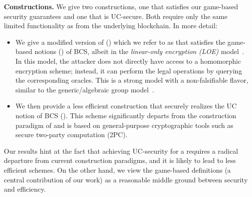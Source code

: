 \smallskip\noindent\textbf{Constructions.} We give two constructions, one that satisfies our game-based security guarantees and one that is UC-secure. Both require only the same limited functionality as \aal from the underlying blockchain. In more detail:
\begin{itemize}
    \item  We give a modified version of \aal () which we refer to as \aalplus that satisfies the game-based notions () of BCS, albeit in the \emph{linear-only encryption (LOE)} model~\cite{TCC:Groth04}. In this model, the attacker does not directly have access to a homomorphic encryption scheme; instead, it can perform the legal operations by querying the corresponding oracles. This is a strong model with a non-falsifiable flavor, similar to the generic/algebraic group model~\cite{EC:Shoup97,IMA:Maurer05,C:FucKilLos18}.
    \item  We then provide a less efficient construction \aaluc that securely realizes the UC notion of BCS (). This scheme significantly departs from the construction paradigm of \aal and is based on general-purpose cryptographic tools such as secure two-party computation (2PC).
\end{itemize}
%
Our results hint at the fact that achieving UC-security for a \syncpuzzle requires a radical departure from current construction paradigms, and it is likely to lead to less efficient schemes. On the other hand, we view the game-based definitions (a central contribution of our work) as a reasonable middle ground between security and efficiency.
